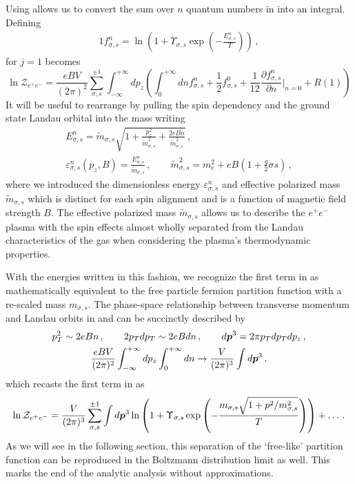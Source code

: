 Using  allows us to convert the sum over $n$ quantum numbers in  into an integral. Defining
\begin{alignat}{1}
 \label{Func} f_{\sigma,s}^{n}=\ln\left(1+\Upsilon_{\sigma,s}\exp\left(-\frac{E_{\sigma,s}^{n}}{T}\right)\right)\,,
\end{alignat}
 for $j=1$ becomes
\begin{equation}
 \label{PartFuncTwo} \ln\mathcal{Z}_{e^{+}e^{-}} = \frac{e{B}V}{(2\pi)^{2}}\sum_{\sigma,s}^{\pm1}\int_{-\infty}^{+\infty}dp_{z}
 \left(\int_{0}^{+\infty}dn f_{\sigma,s}^{n} + \frac{1}{2}f_{\sigma,s}^{0} + \frac{1}{12}\frac{\partial f_{\sigma,s}^{n}}{\partial n}\bigg\rvert_{n=0} + R(1)\right)
\end{equation}
It will be useful to rearrange  by pulling the spin dependency and the ground state Landau orbital into the mass writing
\begin{gather}
 \label{effmass:1}
 E^{n}_{\sigma,s}={\tilde m}_{\sigma,s}\sqrt{1+\frac{p_{z}^{2}}{{\tilde m}_{\sigma,s}^{2}}+\frac{2e{B}n}{{\tilde m}_{\sigma,s}^{2}}}\,,\\
 \label{effmass:2}
 \varepsilon_{\sigma,s}^{n}(p_{z},{B})=\frac{E_{\sigma,s}^{n}}{{\tilde m}_{\sigma,s}}\,,\qquad{\tilde m}_{\sigma,s}^{2}=m_{e}^{2}+e{B}\left(1+\frac{g}{2}\sigma s\right)\,,
\end{gather}
where we introduced the dimensionless energy $\varepsilon^{n}_{\sigma,s}$ and effective polarized mass ${\tilde m}_{\sigma,s}$ which is distinct for each spin alignment and is a function of magnetic field strength ${B}$. The effective polarized mass ${\tilde m}_{\sigma,s}$ allows us to describe the $e^{+}e^{-}$ plasma with the spin effects almost wholly separated from the Landau characteristics of the gas when considering the plasma's thermodynamic properties.

With the energies written in this fashion, we recognize the first term in  as mathematically equivalent to the free particle fermion partition function with a re-scaled mass $m_{\sigma,s}$. The phase-space relationship between transverse momentum and Landau orbits in  and  can be succinctly described by
\begin{gather}
 p_{T}^{2} \sim 2eBn\,,\qquad2p_{T}dp_{T} \sim 2eBdn\,,\qquad d\boldsymbol{p}^{3}=2\pi p_{T}dp_{T}dp_{z}\,,\\
 \frac{eBV}{(2\pi)^{2}}\int_{-\infty}^{+\infty}dp_{z}\int_{0}^{+\infty}dn \rightarrow \frac{V}{(2\pi)^{3}}\int d\boldsymbol{p}^{3}\,,
\end{gather}
which recasts the first term in  as
\begin{align}
 \label{FreePart}
 \ln\mathcal{Z}_{e^{+}e^{-}} = \frac{V}{(2\pi)^{3}}\sum_{\sigma,s}^{\pm1}\int d\boldsymbol{p}^{3}\ln\left(1+\Upsilon_{\sigma,s}\exp{\left(-\frac{m_{\sigma,s}\sqrt{1+p^{2}/m_{\sigma,s}^{2}}}{T}\right)}\right)+\ldots\,.
\end{align}
As we will see in the following section, this separation of the `free-like' partition function can be reproduced in the Boltzmann distribution limit as well. This marks the end of the analytic analysis without approximations.


